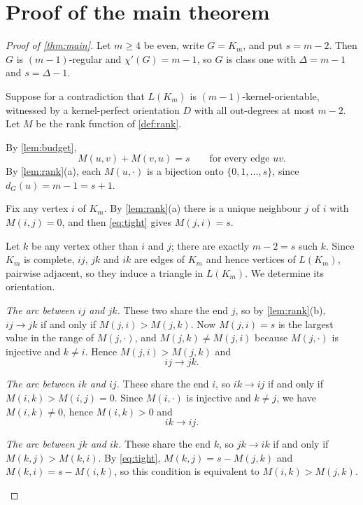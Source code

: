 \documentclass[11pt]{article}
\numberwithin{equation}{section}
\theoremstyle{plain}
\newcommand{\LG}{L}
\begin{document}
\section{Proof of the main theorem}\label{sec:main}

\begin{proof}[Proof of \cref{thm:main}]
Let $m\ge 4$ be even, write $G=K_m$, and put $s=m-2$. Then $G$ is $(m-1)$-regular and
$\chi'(G)=m-1$, so $G$ is class one with $\Delta=m-1$ and $s=\Delta-1$.

Suppose for a contradiction that $\LG(K_m)$ is $(m-1)$-kernel-orientable, witnessed by a
kernel-perfect orientation $D$ with all out-degrees at most $m-2$. Let $M$ be the rank
function of \cref{def:rank}.

\begin{steps}
\item By \cref{lem:budget},
\begin{equation}\label{eq:tight}
  M(u,v)+M(v,u)=s\qquad\text{for every edge } uv .
\end{equation}
By \cref{lem:rank}(a), each $M(u,\cdot)$ is a bijection onto $\{0,1,\dots,s\}$, since
$d_G(u)=m-1=s+1$.

\item Fix any vertex $i$ of $K_m$. By \cref{lem:rank}(a) there is a unique neighbour $j$ of
$i$ with $M(i,j)=0$, and then \eqref{eq:tight} gives $M(j,i)=s$.

\item Let $k$ be any vertex other than $i$ and $j$; there are exactly $m-2=s$ such $k$. Since
$K_m$ is complete, $ij$, $jk$ and $ik$ are edges of $K_m$ and hence vertices of $\LG(K_m)$,
pairwise adjacent, so they induce a triangle in $\LG(K_m)$. We determine its orientation.

\item \emph{The arc between $ij$ and $jk$.} These two share the end $j$, so by
\cref{lem:rank}(b), $ij\to jk$ if and only if $M(j,i)>M(j,k)$. Now $M(j,i)=s$ is the largest
value in the range of $M(j,\cdot)$, and $M(j,k)\ne M(j,i)$ because $M(j,\cdot)$ is injective
and $k\ne i$. Hence $M(j,i)>M(j,k)$ and
\[
  ij\longrightarrow jk .
\]

\item \emph{The arc between $ik$ and $ij$.} These share the end $i$, so $ik\to ij$ if and only
if $M(i,k)>M(i,j)=0$. Since $M(i,\cdot)$ is injective and $k\ne j$, we have $M(i,k)\ne 0$,
hence $M(i,k)>0$ and
\[
  ik\longrightarrow ij .
\]

\item \emph{The arc between $jk$ and $ik$.} These share the end $k$, so $jk\to ik$ if and only
if $M(k,j)>M(k,i)$. By \eqref{eq:tight}, $M(k,j)=s-M(j,k)$ and $M(k,i)=s-M(i,k)$, so this
condition is equivalent to $M(i,k)>M(j,k)$.


\end{steps}
\end{proof}
\end{document}
